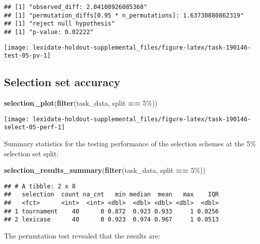 \documentclass[
]{book}
\newenvironment{Shaded}{\begin{snugshade}}{\end{snugshade}}
\newcommand{\FunctionTok}[1]{\textcolor[rgb]{0.13,0.29,0.53}{\textbf{#1}}}
\newcommand{\NormalTok}[1]{#1}
\newcommand{\SpecialCharTok}[1]{\textcolor[rgb]{0.81,0.36,0.00}{\textbf{#1}}}
\newcommand{\StringTok}[1]{\textcolor[rgb]{0.31,0.60,0.02}{#1}}
\begin{document}
\begin{verbatim}
## [1] "observed_diff: 2.04108926085368"
## [1] "permutation_diffs[0.95 * n_permutations]: 1.63730880862319"
## [1] "reject null hypothesis"
## [1] "p-value: 0.02222"
\end{verbatim}

\texttt{[image: lexidate-holdout-supplemental\_files/figure-latex/task-190146-test-05-pv-1]}

\hypertarget{selection-set-accuracy-15}{%
\subsection{Selection set accuracy}\label{selection-set-accuracy-15}}

\begin{Shaded}
\begin{Highlighting}[]
\FunctionTok{selection\_plot}\NormalTok{(}\FunctionTok{filter}\NormalTok{(task\_data, split }\SpecialCharTok{==} \StringTok{\textquotesingle{}5\%\textquotesingle{}}\NormalTok{))}
\end{Highlighting}
\end{Shaded}

\texttt{[image: lexidate-holdout-supplemental\_files/figure-latex/task-190146-select-05-perf-1]}

Summary statistics for the testing performance of the selection schemes at the 5\% selection set split:

\begin{Shaded}
\begin{Highlighting}[]
\FunctionTok{selection\_results\_summary}\NormalTok{(}\FunctionTok{filter}\NormalTok{(task\_data, split }\SpecialCharTok{==} \StringTok{\textquotesingle{}5\%\textquotesingle{}}\NormalTok{))}
\end{Highlighting}
\end{Shaded}

\begin{verbatim}
## # A tibble: 2 x 8
##   selection  count na_cnt   min median  mean   max    IQR
##   <fct>      <int>  <int> <dbl>  <dbl> <dbl> <dbl>  <dbl>
## 1 tournament    40      0 0.872  0.923 0.933     1 0.0256
## 2 lexicase      40      0 0.923  0.974 0.967     1 0.0513
\end{verbatim}

The permutation test revealed that the results are:
\end{document}

